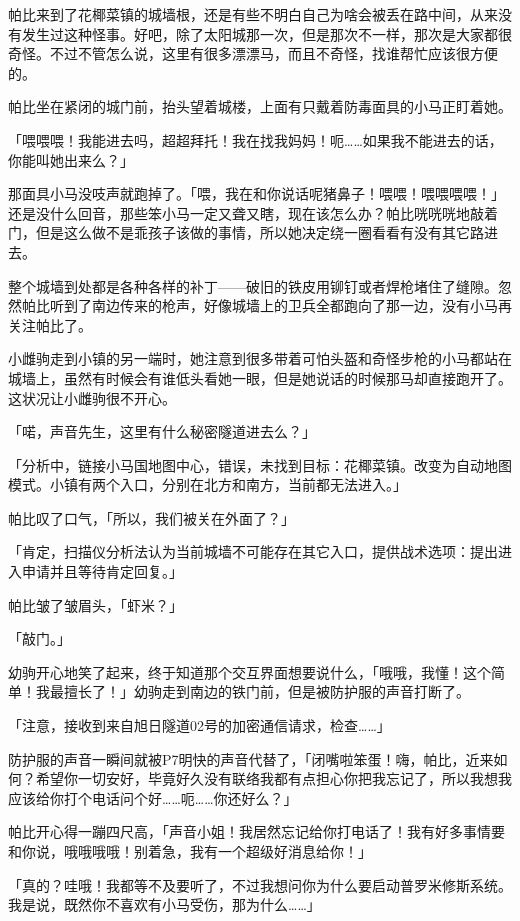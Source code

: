 
帕比来到了花椰菜镇的城墙根，还是有些不明白自己为啥会被丢在路中间，从来没有发生过这种怪事。好吧，除了太阳城那一次，但是那次不一样，那次是大家都很奇怪。不过不管怎么说，这里有很多漂漂马，而且不奇怪，找谁帮忙应该很方便的。

帕比坐在紧闭的城门前，抬头望着城楼，上面有只戴着防毒面具的小马正盯着她。

「喂喂喂！我能进去吗，超超拜托！我在找我妈妈！呃……如果我不能进去的话，你能叫她出来么？」

那面具小马没吱声就跑掉了。「喂，我在和你说话呢猪鼻子！喂喂！喂喂喂喂！」还是没什么回音，那些笨小马一定又聋又瞎，现在该怎么办？帕比咣咣咣地敲着门，但是这么做不是乖孩子该做的事情，所以她决定绕一圈看看有没有其它路进去。

整个城墙到处都是各种各样的补丁——破旧的铁皮用铆钉或者焊枪堵住了缝隙。忽然帕比听到了南边传来的枪声，好像城墙上的卫兵全都跑向了那一边，没有小马再关注帕比了。

小雌驹走到小镇的另一端时，她注意到很多带着可怕头盔和奇怪步枪的小马都站在城墙上，虽然有时候会有谁低头看她一眼，但是她说话的时候那马却直接跑开了。这状况让小雌驹很不开心。

「喏，声音先生，这里有什么秘密隧道进去么？」

「{\mt 分析中，链接小马国地图中心，错误，未找到目标：花椰菜镇。改变为自动地图模式。小镇有两个入口，分别在北方和南方，当前都无法进入。}」

帕比叹了口气，「所以，我们被关在外面了？」

「{\mt 肯定，扫描仪分析法认为当前城墙不可能存在其它入口，提供战术选项：提出进入申请并且等待肯定回复。}」

帕比皱了皱眉头，「虾米？」

「敲门。」

幼驹开心地笑了起来，终于知道那个交互界面想要说什么，「哦哦，我懂！这个简单！我最擅长了！」幼驹走到南边的铁门前，但是被防护服的声音打断了。

「{\mt 注意，接收到来自旭日隧道02号的加密通信请求，检查……}」

防护服的声音一瞬间就被P7明快的声音代替了，「闭嘴啦笨蛋！嗨，帕比，近来如何？希望你一切安好，毕竟好久没有联络我都有点担心你把我忘记了，所以我想我应该给你打个电话问个好……呃……你还好么？」

帕比开心得一蹦四尺高，「声音小姐！我居然忘记给你打电话了！我有好多事情要和你说，哦哦哦哦！别着急，我有一个超级好消息给你！」

「真的？哇哦！我都等不及要听了，不过我想问你为什么要启动普罗米修斯系统。我是说，既然你不喜欢有小马受伤，那为什么……」

